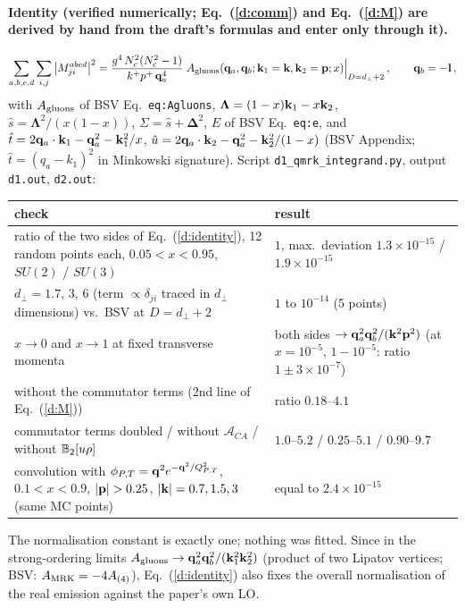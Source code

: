 \paragraph{Identity (verified numerically; Eq.~(\ref{d:comm}) and Eq.~(\ref{d:M}) are derived by hand from the draft's formulas and enter only through it).}
\begin{align}
\sum_{a,b,e,d}\sum_{i,j}\big|M^{abed}_{ji}\big|^2=\frac{g^4\,N_c^2(N_c^2-1)}{k^+p^+\,\mathbf{q}_a^4}\;A_{\rm gluons}(\mathbf{q}_a,\mathbf{q}_b;\mathbf{k}_1=\mathbf{k},\mathbf{k}_2=\mathbf{p};x)\Big|_{D=d_\perp+2}\,,\qquad\mathbf{q}_b=-\mathbf{l}\,,\label{d:identity}
\end{align}
with $A_{\rm gluons}$ of BSV Eq.~\texttt{eq:Agluons}, $\boldsymbol\Lambda=(1-x)\mathbf{k}_1-x\mathbf{k}_2$, $\hat s=\boldsymbol\Lambda^2/(x(1-x))$, $\Sigma=\hat s+\boldsymbol\Delta^2$, $E$ of BSV Eq.~\texttt{eq:e}, and $\hat t=2\mathbf{q}_a\cdot\mathbf{k}_1-\mathbf{q}_a^2-\mathbf{k}_1^2/x$, $\hat u=2\mathbf{q}_a\cdot\mathbf{k}_2-\mathbf{q}_a^2-\mathbf{k}_2^2/(1-x)$ (BSV Appendix; $\hat t=(q_a-k_1)^2$ in Minkowski signature). Script \texttt{d1\_qmrk\_integrand.py}, output \texttt{d1.out}, \texttt{d2.out}:
\begin{center}
\renewcommand{\arraystretch}{1.2}
\begin{tabular}{|p{}|p{}|}\hline
check & result\\\hline
ratio of the two sides of Eq.~(\ref{d:identity}), 12 random points each, $0.05<x<0.95$, $SU(2)$ / $SU(3)$ & $1$, max.\ deviation $1.3\times10^{-15}$ / $1.9\times10^{-15}$\\
$d_\perp=1.7,\,3,\,6$ (term $\propto\delta_{ji}$ traced in $d_\perp$ dimensions) vs.\ BSV at $D=d_\perp+2$ & $1$ to $10^{-14}$ (5 points)\\
$x\to0$ and $x\to1$ at fixed transverse momenta & both sides $\to\mathbf{q}_a^2\mathbf{q}_b^2/(\mathbf{k}^2\mathbf{p}^2)$ (at $x=10^{-5}$, $1-10^{-5}$: ratio $1\pm3\times10^{-7}$)\\
without the commutator terms (2nd line of Eq.~(\ref{d:M})) & ratio $0.18$--$4.1$\\
commutator terms doubled / without $\mathcal A_{CA}$ / without $\mathbb{B}_2[u\rho]$ & $1.0$--$5.2$ / $0.25$--$5.1$ / $0.90$--$9.7$\\
convolution with $\phi_{P,T}=\mathbf{q}^2e^{-\mathbf{q}^2/Q^2_{P,T}}$, $0.1<x<0.9$, $|\v p|>0.25$, $|\mathbf{k}|=0.7,1.5,3$ (same MC points) & equal to $2.4\times10^{-15}$\\\hline
\end{tabular}
\end{center}
The normalisation constant is exactly one; nothing was fitted. Since in the strong-ordering limits $A_{\rm gluons}\to\mathbf{q}_a^2\mathbf{q}_b^2/(\mathbf{k}_1^2\mathbf{k}_2^2)$ (product of two Lipatov vertices; BSV: $A_{\rm MRK}=-4A_{(4)}$), Eq.~(\ref{d:identity}) also fixes the overall normalisation of the real emission against the paper's own LO.

